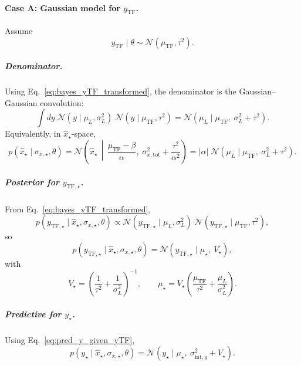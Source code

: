 \paragraph{Case A: Gaussian model for $y_{\mathrm{TF}}$.}
Assume
\begin{equation}
y_{\mathrm{TF}} \mid \theta \sim \mathcal N(\mu_{\mathrm{TF}},\tau^2).
\end{equation}

\subparagraph{Denominator.}
Using Eq.~\eqref{eq:bayes_yTF_transformed}, the denominator is the Gaussian--Gaussian convolution:
\begin{equation}
\int dy\;\mathcal N(y\mid \mu_L,\sigma_L^2)\;\mathcal N(y\mid \mu_{\mathrm{TF}},\tau^2)
=
\mathcal N\!\left(\mu_L \mid \mu_{\mathrm{TF}},\ \sigma_L^2+\tau^2\right).
\label{eq:denom_gauss_yspace}
\end{equation}
Equivalently, in $\hat x_\star$-space,
\begin{equation}
p\!\left(\hat x_\star\mid \sigma_{x,\star},\theta\right)
=
\mathcal N\!\left(
\hat x_\star \,\middle|\,
\frac{\mu_{\mathrm{TF}}-\beta}{\alpha},\;
\sigma_{x,\mathrm{tot}}^2+\frac{\tau^2}{\alpha^2}
\right)
=
|\alpha|\;\mathcal N\!\left(\mu_L \mid \mu_{\mathrm{TF}},\ \sigma_L^2+\tau^2\right).
\end{equation}

\subparagraph{Posterior for $y_{\mathrm{TF},\star}$.}
From Eq.~\eqref{eq:bayes_yTF_transformed},
\begin{equation}
p\!\left(y_{\mathrm{TF},\star}\mid \hat x_\star,\sigma_{x,\star},\theta\right)
\propto
\mathcal N(y_{\mathrm{TF},\star}\mid \mu_L,\sigma_L^2)\;
\mathcal N(y_{\mathrm{TF},\star}\mid \mu_{\mathrm{TF}},\tau^2),
\end{equation}
so
\begin{equation}
p\!\left(y_{\mathrm{TF},\star}\mid \hat x_\star,\sigma_{x,\star},\theta\right)
=
\mathcal N\!\left(y_{\mathrm{TF},\star}\mid \mu_\star,\ V_\star\right),
\label{eq:post_yTF_gauss}
\end{equation}
with
\begin{equation}
V_\star
=
\left(\frac{1}{\tau^2}+\frac{1}{\sigma_L^2}\right)^{-1},
\qquad
\mu_\star
=
V_\star\left(\frac{\mu_{\mathrm{TF}}}{\tau^2}+\frac{\mu_L}{\sigma_L^2}\right).
\label{eq:post_yTF_gauss_params}
\end{equation}

\subparagraph{Predictive for $y_\star$.}
Using Eq.~\eqref{eq:pred_y_given_yTF},
\begin{equation}
p\!\left(y_\star \mid \hat x_\star,\sigma_{x,\star},\theta\right)
=
\mathcal N\!\left(y_\star \mid \mu_\star,\ \sigma_{\mathrm{int},y}^2+V_\star\right).
\label{eq:pred_y_gauss}
\end{equation}

